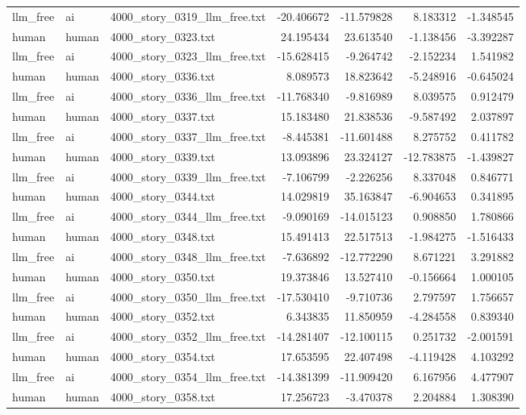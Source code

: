 \begin{longtable}{lllrrrr}
llm\_free & ai & 4000\_story\_0319\_llm\_free.txt & -20.406672 & -11.579828 & 8.183312 & -1.348545 \\
human & human & 4000\_story\_0323.txt & 24.195434 & 23.613540 & -1.138456 & -3.392287 \\
llm\_free & ai & 4000\_story\_0323\_llm\_free.txt & -15.628415 & -9.264742 & -2.152234 & 1.541982 \\
human & human & 4000\_story\_0336.txt & 8.089573 & 18.823642 & -5.248916 & -0.645024 \\
llm\_free & ai & 4000\_story\_0336\_llm\_free.txt & -11.768340 & -9.816989 & 8.039575 & 0.912479 \\
human & human & 4000\_story\_0337.txt & 15.183480 & 21.838536 & -9.587492 & 2.037897 \\
llm\_free & ai & 4000\_story\_0337\_llm\_free.txt & -8.445381 & -11.601488 & 8.275752 & 0.411782 \\
human & human & 4000\_story\_0339.txt & 13.093896 & 23.324127 & -12.783875 & -1.439827 \\
llm\_free & ai & 4000\_story\_0339\_llm\_free.txt & -7.106799 & -2.226256 & 8.337048 & 0.846771 \\
human & human & 4000\_story\_0344.txt & 14.029819 & 35.163847 & -6.904653 & 0.341895 \\
llm\_free & ai & 4000\_story\_0344\_llm\_free.txt & -9.090169 & -14.015123 & 0.908850 & 1.780866 \\
human & human & 4000\_story\_0348.txt & 15.491413 & 22.517513 & -1.984275 & -1.516433 \\
llm\_free & ai & 4000\_story\_0348\_llm\_free.txt & -7.636892 & -12.772290 & 8.671221 & 3.291882 \\
human & human & 4000\_story\_0350.txt & 19.373846 & 13.527410 & -0.156664 & 1.000105 \\
llm\_free & ai & 4000\_story\_0350\_llm\_free.txt & -17.530410 & -9.710736 & 2.797597 & 1.756657 \\
human & human & 4000\_story\_0352.txt & 6.343835 & 11.850959 & -4.284558 & 0.839340 \\
llm\_free & ai & 4000\_story\_0352\_llm\_free.txt & -14.281407 & -12.100115 & 0.251732 & -2.001591 \\
human & human & 4000\_story\_0354.txt & 17.653595 & 22.407498 & -4.119428 & 4.103292 \\
llm\_free & ai & 4000\_story\_0354\_llm\_free.txt & -14.381399 & -11.909420 & 6.167956 & 4.477907 \\
human & human & 4000\_story\_0358.txt & 17.256723 & -3.470378 & 2.204884 & 1.308390 \\

\end{longtable}
